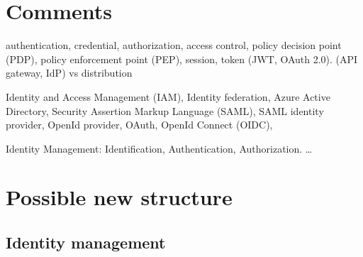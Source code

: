 \section{Comments}
\begin{sloppypar}
    authentication, 
    credential, 
    authorization, 
    access control, 
    policy decision point (PDP), 
    policy enforcement point (PEP), 
    session, 
    token (JWT, OAuth 2.0). 
    (API gateway, IdP) vs distribution
\end{sloppypar}
\begin{sloppypar}
    Identity and Access Management (IAM),
    Identity federation, 
    Azure Active Directory,
    Security Assertion Markup Language (SAML),
    SAML identity provider,
    OpenId provider,
    OAuth,
    OpenId Connect (OIDC),
\begin{sloppypar}
    Identity Management: Identification, Authentication, Authorization.
    \dots
\end{sloppypar}

\section{Possible new structure}
\subsection{Identity management}







\end{sloppypar}
